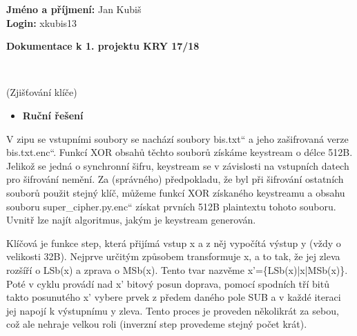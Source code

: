 \documentclass[11pt,a4paper]{article}
\providecommand{\uvoz}[1]{\quotedblbase #1\textquotedblleft}
\begin{document}
\noindent \textbf{Jméno a příjmení:} Jan Kubiš\\
\textbf{Login:} xkubis13\\
\smallskip
\begin{center}
	\begin{LARGE}\textbf{Dokumentace k 1. projektu KRY 17/18}\end{LARGE}\\
	\begin{large}(Zjišťování klíče)\end{large}
\end{center}
\bigskip



\begin{itemize}[leftmargin=0cm]
\item{\textbf{Ruční řešení}}
\end{itemize}
V zipu se vstupními soubory se nachází soubory \uvoz{bis.txt} a jeho zašifrovaná verze \uvoz{bis.txt.enc}. Funkcí XOR obsahů těchto souborů získáme keystream o délce 512B. Jelikož se jedná o synchronní šifru, keystream se v závislosti na vstupních datech pro šifrování nemění. Za (správného) předpokladu, že byl při šifrování ostatních souborů použit stejný klíč, můžeme funkcí XOR získaného keystreamu a obsahu souboru \uvoz{super\_cipher.py.enc} získat prvních 512B plaintextu tohoto souboru. Uvnitř lze najít algoritmus, jakým je keystream generován.

Klíčová je funkce step, která přijímá vstup x a z něj vypočítá výstup y (vždy o velikosti 32B). Nejprve určitým způsobem transformuje x, a to tak, že jej zleva rozšíří o LSb(x) a zprava o MSb(x). Tento tvar nazvěme x'=\{LSb(x)|x|MSb(x)\}. Poté v cyklu provádí nad x' bitový posun doprava, pomocí spodních tří bitů takto posunutého x' vybere prvek z předem daného pole SUB a v každé iteraci jej napojí k výstupnímu y zleva. Tento proces je proveden několikrát za sebou, což ale nehraje velkou roli (inverzní step provedeme stejný počet krát).
\end{document}
